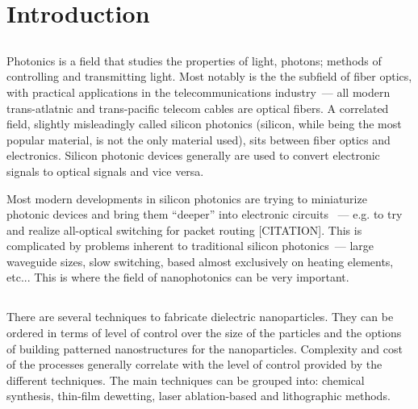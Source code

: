 \section{Introduction}
\label{ch:Intro}
    \subsection{}
        \label{sec:Photonics}
            Photonics is a field that studies the properties of light, photons; methods
        of controlling and transmitting light. Most notably is the the subfield of fiber optics,
        with practical applications in the telecommunications industry~--- all modern trans-atlatnic
        and trans-pacific telecom cables are optical fibers. A correlated field, slightly misleadingly
        called silicon photonics (silicon, while being the most popular material, is not the only
        material used), sits between fiber optics and electronics. Silicon photonic devices
        generally are used to convert electronic signals to optical signals and vice versa.

            Most modern developments in silicon photonics are trying to miniaturize photonic
        devices and bring them ``deeper'' into electronic circuits ~--- e.g. to try and
        realize all-optical switching for packet routing [CITATION]. This is complicated by
        problems inherent to traditional silicon photonics~--- large waveguide sizes, slow switching,
        based almost exclusively on heating elements, etc... This is where the field of nanophotonics
        can be very important.

        \cite{krasnok2015towards}
    \subsection{}
        \cite{kuznetsov2012magnetic}
    \subsection{}
            There are several techniques to fabricate dielectric nanoparticles. They can be ordered in terms of level of control over the size
        of the particles and the options of building patterned nanostructures for the nanoparticles. Complexity and cost of the processes generally
        correlate with the level of control provided by the different techniques.
            The main techniques can be grouped into: chemical synthesis, thin-film dewetting, laser ablation-based and lithographic methods.

